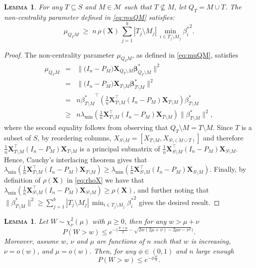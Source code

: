 \documentclass[bj,authoryear]{imsart}
\theoremstyle{plain}
\newtheorem{lem}[thm]{\textsc{Lemma}}
\newcommand{\M}{\mathcal{M}}
\newcommand{\bs}{\boldsymbol}
\begin{document}
\begin{lem}\label{lem:boundrhogen}
 For any $T\subseteq S$ and $M\in\M$ such that $T\not\subseteq M$, let $Q_T=M \cup T$. The non-centrality parameter defined in \eqref{eq:muQM} satisfies: 
\begin{equation}
    \mu_{Q_TM}\; \geq \;n\,\rho(\bs X)\,\sum_{j=1}^b|T_j\setminus M_j|\,\min_{i\in T_j\setminus M_j}{\beta_{i}^*}^2.
\end{equation}
\end{lem}

\begin{proof} 
The non-centrality parameter $\mu_{Q_TM}$, as defined in \eqref{eq:muQM}, satisfies
\begin{eqnarray*}
    \mu_{Q_TM}&=&\|\big(I_n-P_M\big) \bs X_{Q_T\setminus M} \bs \beta^*_{Q_T\setminus M}\|^2\\
    &=&\|\big(I_n-P_M\big) \bs X_{T\setminus M} \bs \beta^*_{T\setminus M}\|^2\\
    &= & n {\beta^*_{T\setminus M}}^\top \left(\tfrac1n \bs X_{T\setminus M}^\top(I_n-P_M)\bs X_{T\setminus M}\right)\beta^*_{T\setminus M}\\
    &\geq & n\lambda_{\min}\left(\tfrac1n \bs X_{T\setminus M}^\top(I_n-P_M)\bs X_{T\setminus M}\right)\|\beta^*_{T\setminus M}\|^2,
\end{eqnarray*}
where the second equality follows from observing that $Q_T\setminus M=T\setminus M$. Since $T$ is a subset of $S$, by reordering columns, $X_{S\setminus M}=[X_{T\setminus M},X_{S\setminus (M\cup T)}]$ and therefore $\tfrac1n \bs X_{T\setminus M}^\top(I_n-P_M)\bs X_{T\setminus M}$ is a principal submatrix of $\tfrac1n \bs X_{S\setminus M}^\top(I_n-P_M)\bs X_{S\setminus M}$. Hence, Cauchy's interlacing theorem gives that $\lambda_{\min}\left(\tfrac1n \bs X_{T\setminus M}^\top(I_n-P_M)\bs X_{T\setminus M}\right) \geq \lambda_{\min}\left(\tfrac1n \bs X_{S\setminus M}^\top(I_n-P_M)\bs X_{S\setminus M}\right)$. Finally, by definition of $\rho(\bs X)$ in \eqref{eq:rhoX} we have that
$\lambda_{\min}\left(\tfrac1n \bs X_{S\setminus M}^\top(I_n-P_M)\bs X_{S\setminus M}\right) \geq \rho(\bs X)$, and further noting that $\|\beta^*_{T\setminus M}\|^2\geq \sum_{j=1}^b|T_j\setminus M_j|\,\min_{i\in T_j\setminus M_j}{\beta_{i}^*}^2$ gives the desired result.
\end{proof}

\begin{lem}\label{lemma:s1s3}
Let $W\sim\chi_{\nu}^2(\mu)$ with $\mu \geq 0$, then for any $w>\mu+\nu$
$$P(W > w) \leq e^{-\big(\frac{w+\mu}{2}  - \sqrt{2w( 2 \mu+ \nu)-2 \mu \nu - \nu^2 } \big)}. $$
Moreover, assume $w$, $\nu$ and $\mu$ are functions of $n$ such that $w$ is increasing, $\nu=o(w)$, and $\mu=o(w)$. Then, for any $\phi\in(0,1)$ and $n$ large enough
$$P(W > w)  \leq  e^{-\phi\frac{w}{2}}.$$
\end{lem}
\end{document}
